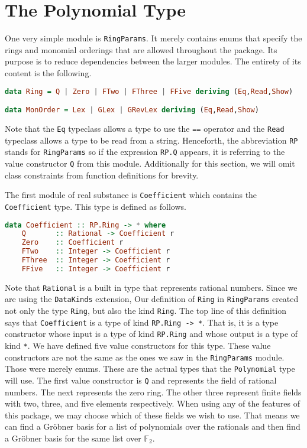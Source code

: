 \documentclass[MS, xcolor=dvipsnames]{wfuthesis}
\def\bF{\mathbb{F}}
\theoremstyle{definition}
\begin{document}
\section{The Polynomial Type}
One very simple module is \lstinline{RingParams}. It merely contains enums that specify the rings and monomial orderings that are allowed throughout the package. Its purpose is to reduce dependencies between the larger modules. The entirety of its content is the following.
\begin{lstlisting}[language=Haskell]
data Ring = Q | Zero | FTwo | FThree | FFive deriving (Eq,Read,Show)

data MonOrder = Lex | GLex | GRevLex deriving (Eq,Read,Show)
\end{lstlisting}
Note that the \lstinline{Eq} typeclass allows a type to use the \lstinline{==} operator and the \lstinline{Read} typeclass allows a type to be read from a string. Henceforth, the abbreviation \lstinline{RP} stands for \lstinline{RingParams} so if the expression \lstinline{RP.Q} appears, it is referring to the value constructor \lstinline{Q} from this module. Additionally for this section, we will omit class constraints from function definitions for brevity. \par
The first module of real substance is \lstinline{Coefficient} which contains the \lstinline{Coefficient} type. This type is defined as follows.
\begin{lstlisting}[language=Haskell]
data Coefficient :: RP.Ring -> * where
    Q       :: Rational -> Coefficient r
    Zero    :: Coefficient r
    FTwo    :: Integer -> Coefficient r
    FThree  :: Integer -> Coefficient r
    FFive   :: Integer -> Coefficient r
\end{lstlisting}
Note that \lstinline{Rational} is a built in type that represents rational numbers. Since we are using the \lstinline{DataKinds} extension, Our definition of \lstinline{Ring} in \lstinline{RingParams} created not only the type \lstinline{Ring}, but also the kind \lstinline{Ring}. The top line of this definition says that \lstinline{Coefficient} is a type of kind \lstinline{RP.Ring -> *}. That is, it is a type constructor whose input is a type of kind \lstinline{RP.Ring} and whose output is a type of kind \lstinline{*}. We have defined five value constructors for this type. These value constructors are not the same as the ones we saw in the \lstinline{RingParams} module. Those were merely enums. These are the actual types that the \lstinline{Polynomial} type will use. The first value constructor is \lstinline{Q} and represents the field of rational numbers. The next represents the zero ring. The other three represent finite fields with two, three, and five elements respectively. When using any of the features of this package, we may choose which of these fields we wish to use. That means we can find a Gr\"obner basis for a list of polynomials over the rationals and then find a Gr\"obner basis for the same list over $\bF_2$. \par
\end{document}
